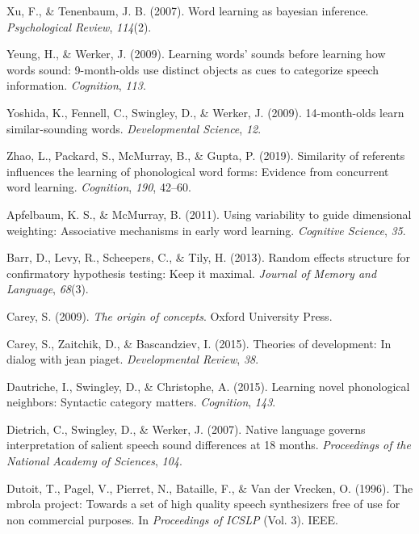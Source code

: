 \documentclass[english,,man]{apa6}
\begin{document}
\leavevmode\hypertarget{ref-xu2007}{}%
Xu, F., \& Tenenbaum, J. B. (2007). Word learning as bayesian inference. \emph{Psychological Review}, \emph{114}(2).

\leavevmode\hypertarget{ref-yeung09}{}%
Yeung, H., \& Werker, J. (2009). Learning words' sounds before learning how words sound: 9-month-olds use distinct objects as cues to categorize speech information. \emph{Cognition}, \emph{113}.

\leavevmode\hypertarget{ref-yoshida2009}{}%
Yoshida, K., Fennell, C., Swingley, D., \& Werker, J. (2009). 14-month-olds learn similar-sounding words. \emph{Developmental Science}, \emph{12}.

\leavevmode\hypertarget{ref-Zhao2019}{}%
Zhao, L., Packard, S., McMurray, B., \& Gupta, P. (2019). Similarity of referents influences the learning of phonological word forms: Evidence from concurrent word learning. \emph{Cognition}, \emph{190}, 42--60.

\leavevmode\hypertarget{ref-apfelbaum2011}{}%
Apfelbaum, K. S., \& McMurray, B. (2011). Using variability to guide dimensional weighting: Associative mechanisms in early word learning. \emph{Cognitive Science}, \emph{35}.

\leavevmode\hypertarget{ref-barr2013}{}%
Barr, D., Levy, R., Scheepers, C., \& Tily, H. (2013). Random effects structure for confirmatory hypothesis testing: Keep it maximal. \emph{Journal of Memory and Language}, \emph{68}(3).

\leavevmode\hypertarget{ref-carey2009}{}%
Carey, S. (2009). \emph{The origin of concepts}. Oxford University Press.

\leavevmode\hypertarget{ref-carey2015}{}%
Carey, S., Zaitchik, D., \& Bascandziev, I. (2015). Theories of development: In dialog with jean piaget. \emph{Developmental Review}, \emph{38}.

\leavevmode\hypertarget{ref-dautriche2015}{}%
Dautriche, I., Swingley, D., \& Christophe, A. (2015). Learning novel phonological neighbors: Syntactic category matters. \emph{Cognition}, \emph{143}.

\leavevmode\hypertarget{ref-dietrich2007}{}%
Dietrich, C., Swingley, D., \& Werker, J. (2007). Native language governs interpretation of salient speech sound differences at 18 months. \emph{Proceedings of the National Academy of Sciences}, \emph{104}.

\leavevmode\hypertarget{ref-dutoit1996}{}%
Dutoit, T., Pagel, V., Pierret, N., Bataille, F., \& Van der Vrecken, O. (1996). The mbrola project: Towards a set of high quality speech synthesizers free of use for non commercial purposes. In \emph{Proceedings of ICSLP} (Vol. 3). IEEE.
\end{document}
